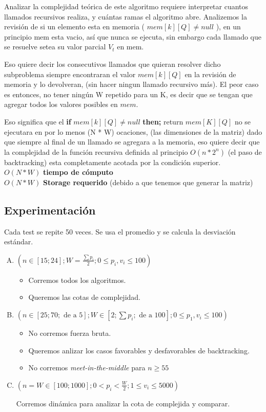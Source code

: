 \documentclass[fleqn, 11pt]{article}
\begin{document}
Analizar la complejidad teórica de este algoritmo requiere interpretar cuantos llamados recursivos realiza, y cuántas ramas el algoritmo abre. Analizemos la revisión de si un elemento esta en memoria ( $mem[k][Q] \neq null$ ), en un principio mem esta vacio,  así que nunca se ejecuta, sin embargo cada llamado que se resuelve setea su valor parcial \textit{$V_t$} en mem.

Eso quiere decir los consecutivos llamados que quieran resolver dicho subproblema siempre encontraran el valor $mem[k][Q]$ en la revisión de memoria y lo devolveran, (sin hacer ningun llamado recursivo más). El peor caso es entonces, no tener ningún W repetido para un K, es decir que se tengan que agregar todos los valores posibles en $mem$.

Eso significa que el \textbf{if} $mem[k][Q] \neq null$ \textbf{then;} return $mem[K][Q]$ no se ejecutara en por lo menos (N * W) ocaciones, (las dimensiones de la matriz) dado que siempre al final de un llamado se agregara a la memoria, eso quiere decir que la complejidad de la función recursiva definida al principio $O(n*2^n)$ (el paso de backtracking) esta completamente acotada por la condición superior. \\

\small $O(N * W)$ \textbf{tiempo de cómputo} \\
\small $O(N * W)$ \textbf{Storage requerido} (debido a que tenemos que generar la matriz) \\

\subsection{Experimentación}

Cada test se repite 50 veces. Se usa el promedio y se calcula la desviación
estándar.

\begin{enumerate}[A.]
\item $(n \in [15; 24];
	W=\frac{\sum p_i}{2};
	0 \leq p_i, v_i \leq 100)$

\begin{itemize}
\item Corremos todos los algoritmos.
\item Queremos las cotas de complejidad.
\end{itemize}

\item $(n \in [25; 70; \text{ de a } 5];
	W \in [2; \sum p_i; \text{ de a } 100];
	0 \leq p_1, v_i \leq 100)$

\begin{itemize}
\item No corremos fuerza bruta.
\item Queremos anlizar los casos favorables y desfavorables de backtracking.
\item No corremos \emph{meet-in-the-middle} para $n \geq 55$
\end{itemize}

\item $(n = W \in [100; 1000];
        0 < p_i < \frac{W}{2};
        1 \leq v_i \leq 5000)$

Corremos dinámica para analizar la cota de complejida y comparar.
\end{enumerate}
\end{document}
